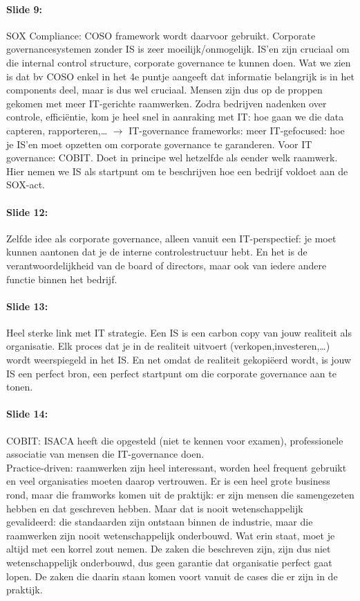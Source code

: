 \documentclass[10pt,a4paper]{report}
\begin{document}
\paragraph{Slide 9:}SOX Compliance: COSO framework wordt daarvoor gebruikt. Corporate governancesystemen zonder IS is zeer moeilijk/onmogelijk. IS'en zijn cruciaal om die internal control structure, corporate governance te kunnen doen. Wat we zien is dat bv COSO enkel in het 4e puntje aangeeft dat informatie belangrijk is in het components deel, maar is dus wel cruciaal. Mensen zijn dus op de proppen gekomen met meer IT-gerichte raamwerken. Zodra bedrijven nadenken over controle, efficiëntie, kom je heel snel in aanraking met IT: hoe gaan we die data capteren, rapporteren,… $\rightarrow$ IT-governance frameworks: meer IT-gefocused: hoe je IS'en moet opzetten om corporate governance te garanderen.
Voor IT governance: COBIT. Doet in principe wel hetzelfde als eender welk raamwerk. Hier nemen we IS als startpunt om te beschrijven hoe een bedrijf voldoet aan de SOX-act.

\paragraph{Slide 12:}Zelfde idee als corporate governance, alleen vanuit een IT-perspectief: je moet kunnen aantonen dat je de interne controlestructuur hebt. En het is de verantwoordelijkheid van de board of directors, maar ook van iedere andere functie binnen het bedrijf.

\paragraph{Slide 13:}Heel sterke link met IT strategie. Een IS is een carbon copy van jouw realiteit als organisatie. Elk proces dat je in de realiteit uitvoert (verkopen,investeren,…) wordt weerspiegeld in het IS. En net omdat de realiteit gekopiëerd wordt, is jouw IS een perfect bron, een perfect startpunt om die corporate governance aan te tonen.

\paragraph{Slide 14:}COBIT: ISACA heeft die opgesteld (niet te kennen voor examen), professionele associatie van mensen die IT-governance doen.\\
Practice-driven: raamwerken zijn heel interessant, worden heel frequent gebruikt en veel organisaties moeten daarop vertrouwen. Er is een heel grote business rond, maar die framworks komen uit de praktijk: er zijn mensen die samengezeten hebben en dat geschreven hebben. Maar dat is nooit wetenschappelijk gevalideerd: die standaarden zijn ontstaan binnen de industrie, maar die raamwerken zijn nooit wetenschappelijk onderbouwd. Wat erin staat, moet je altijd met een korrel zout nemen. De zaken die beschreven zijn, zijn dus niet wetenschappelijk onderbouwd, dus geen garantie dat organisatie perfect gaat lopen. De zaken die daarin staan komen voort vanuit de cases die er zijn in de praktijk.
\end{document}
